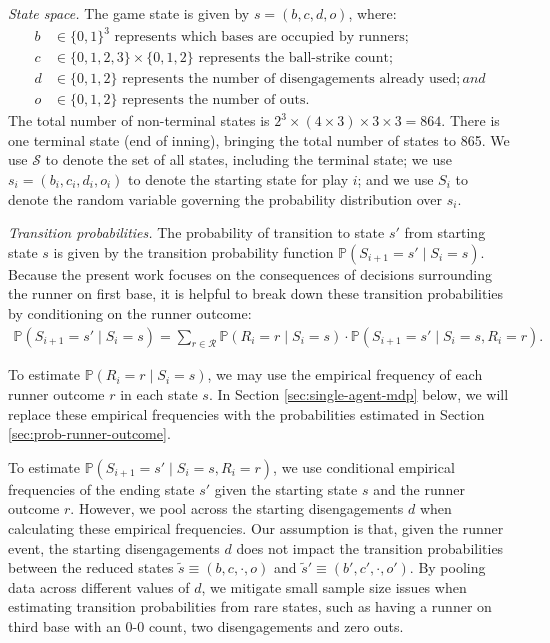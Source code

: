 \documentclass{article}
\begin{document}
        {\it State space.} The game state is given by $s = (b, c, d, o)$, where:
        \begin{align*}
          b &\in \{0, 1\}^3 \mbox{ represents which bases are occupied by runners};\\
          c &\in \{0, 1, 2, 3\} \times \{0, 1, 2\} \mbox{ represents the ball-strike count};\\
          d &\in \{0, 1, 2\} \mbox{ represents the number of disengagements already used}; and\\
          o &\in \{0, 1, 2\} \mbox{ represents the number of outs}.
        \end{align*}
        The total number of non-terminal states is $2^3 \times (4 \times 3) \times 3 \times 3 = 864$. There is one terminal state (end of inning), bringing the total number of states to 865. We use $\mathcal{S}$ to denote the set of all states, including the terminal state; we use $s_i = (b_i, c_i, d_i, o_i)$ to denote the starting state for play $i$; and we use $S_i$ to denote the random variable governing the probability distribution over $s_i$.
  
        {\it Transition probabilities.} The probability of transition to state $s'$ from starting state $s$ is given by the transition probability function $\mathbb{P}(S_{i+1} = s' \mid S_i = s)$. Because the present work focuses on the consequences of decisions surrounding the runner on first base, it is helpful to break down these transition probabilities by conditioning on the runner outcome:
        \begin{align}
          \label{eqn:transition-prob}
          \mathbb{P}(S_{i+1} = s' \mid S_i = s) = \sum_{r \in \mathcal{R}} \mathbb{P}(R_i = r \mid S_i = s) \cdot \mathbb{P}(S_{i+1} = s' \mid S_i = s, R_i = r).
        \end{align}

        To estimate $\mathbb{P}(R_i = r \mid S_i = s)$, we may use the empirical frequency of each runner outcome $r$ in each state $s$. In Section \ref{sec:single-agent-mdp} below, we will replace these empirical frequencies with the probabilities estimated in Section \ref{sec:prob-runner-outcome}.
        
        To estimate $\mathbb{P}(S_{i+1} = s' \mid S_i = s, R_i = r)$, we use conditional empirical frequencies of the ending state $s'$ given the starting state $s$ and the runner outcome $r$. However, we pool across the starting disengagements $d$ when calculating these empirical frequencies. Our assumption is that, given the runner event, the starting disengagements $d$ does not impact the transition probabilities between the reduced states $\tilde s \equiv (b, c, \cdot, o)$ and $\tilde s' \equiv (b', c', \cdot, o')$. By pooling data across different values of $d$, we mitigate small sample size issues when estimating transition probabilities from rare states, such as having a runner on third base with an 0-0 count, two disengagements and zero outs.
        
\end{document}
